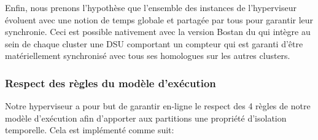 \documentclass[main.tex]{subfiles}
\begin{document}
Enfin, nous prenons l'hypothèse que l'ensemble des instances de l'hyperviseur évoluent avec une notion de temps globale et partagée par tous pour garantir leur synchronie. Ceci est possible nativement avec la version Bostan du \mppalong qui intègre au sein de chaque cluster une DSU comportant un compteur qui est garanti d'être matériellement synchronisé avec tous ses homologues sur les autres clusters. 


\subsubsection{Respect des règles du modèle d'exécution}
\label{sssec_resumeFr_repectReglesEM}
Notre hyperviseur a pour but de garantir en-ligne le respect des 4 règles de notre modèle d'exécution afin d'apporter aux partitions une propriété d'isolation temporelle. Cela est implémenté comme suit:
\end{document}
